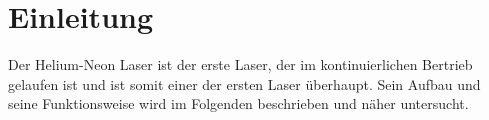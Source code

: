 \section{Einleitung}
Der Helium-Neon Laser ist der erste Laser, der im kontinuierlichen Bertrieb gelaufen ist und ist somit einer der ersten Laser überhaupt.
Sein Aufbau und seine Funktionsweise wird im Folgenden beschrieben und näher untersucht.
